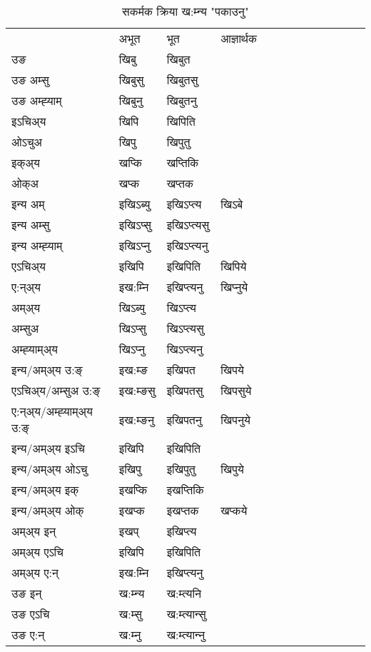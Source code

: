 \begin{table}[H]
\centering
\caption{\label{ip.vt} सकर्मक क्रिया  ख:म्‍न्य  "पकाउनु"  }
\begin{tabular}{l|l|l|l|l|l|l|l|l|l|l|l|l}  \toprule
&अभूत & भूत & आज्ञार्थक \\ 
उङ &खिबु &खिबुत \\ 
उङ अम्सु &खिबुसु &खिबुतसु \\ 
उङ अम्ह्‍याम् &खिबुनु &खिबुतनु \\ 
इऽचिअ्य &खिपि &खिपिति   \\ 
ओऽचुअ &खिपु &खिपुतु   \\ 
इक्अ्य &खप्कि &खप्‍तिकि   \\ 
ओक्अ &खप्क &खप्‍तक   \\ 
इन्य अम् & इखिऽब्यु  & इखिऽप्‍त्य &खिऽबे  \\ 
इन्य अम्सु & इखिऽप्सु  & इखिऽप्‍त्यसु   \\ 
इन्य अम्ह्‍याम् & इखिऽप्‍नु  & इखिऽप्‍त्यनु   \\ 
एऽचिअ्य & इखिपि & इखिपिति &खिपिये    \\ 
ए:न्अ्य & इख:म्‍नि  & इखिप्‍त्यनु &खिप्‍नुये  \\ 
अम्अ्य & खिऽब्यु  & खिऽप्‍त्य  \\ 
अम्सुअ & खिऽप्सु & खिऽप्‍त्यसु  \\ 
अम्ह्‍याम्अ्य & खिऽप्‍नु  & खिऽप्‍त्यनु \\ 
\midrule
इन्य/अम्अ्य उ:ङ्‌&इख:म्ङ & इखिपत &खिपये \\ 
एऽचिअ्य/अम्सुअ उ:ङ्‌ &इख:म्ङसु & इखिपतसु &खिपसुये \\ 
ए:न्अ्य/अम्ह्‍याम्अ्य उ:ङ्‌ &इख:म्ङनु & इखिपतनु &खिपनुये \\ 
इन्य/अम्अ्य इऽचि & इखिपि & इखिपिति    \\ 
इन्य/अम्अ्य ओऽचु & इखिपु & इखिपुतु  &खिपुये  \\ 
इन्य/अम्अ्य इक् & इखप्कि & इखप्‍तिकि   \\ 
इन्य/अम्अ्य ओक् & इखप्क & इखप्‍तक  &खप्कये  \\ 
अम्अ्य इन् & इखप् & इखिप्‍त्य   \\ 
अम्अ्य एऽचि & इखिपि & इखिपिति    \\ 
अम्अ्य ए:न् & इख:म्‍नि  & इखिप्‍त्यनु  \\ 
\midrule
उङ इन् & ख:म्‍न्य  & ख:म्त्यनि  \\ 
उङ एऽचि & ख:म्सु  & ख:म्त्यान्सु   \\ 
उङ ए:न्& ख:म्‍नु  & ख:म्त्यान्‍नु   \\ 
\bottomrule
\end{tabular}
\end{table}


